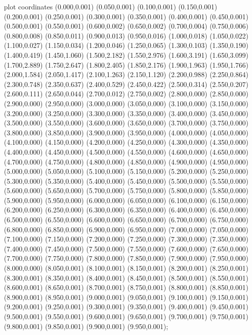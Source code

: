  plot coordinates {(0.000,0.001) (0.050,0.001) (0.100,0.001) (0.150,0.001) (0.200,0.001) (0.250,0.001) (0.300,0.001) (0.350,0.001) (0.400,0.001) (0.450,0.001) (0.500,0.001) (0.550,0.001) (0.600,0.002) (0.650,0.002) (0.700,0.004) (0.750,0.006) (0.800,0.008) (0.850,0.011) (0.900,0.013) (0.950,0.016) (1.000,0.018) (1.050,0.022) (1.100,0.027) (1.150,0.034) (1.200,0.046) (1.250,0.065) (1.300,0.103) (1.350,0.190) (1.400,0.419) (1.450,1.060) (1.500,2.182) (1.550,2.976) (1.600,3.191) (1.650,3.099) (1.700,2.889) (1.750,2.647) (1.800,2.405) (1.850,2.176) (1.900,1.963) (1.950,1.766) (2.000,1.584) (2.050,1.417) (2.100,1.263) (2.150,1.120) (2.200,0.988) (2.250,0.864) (2.300,0.748) (2.350,0.637) (2.400,0.529) (2.450,0.422) (2.500,0.314) (2.550,0.207) (2.600,0.111) (2.650,0.044) (2.700,0.012) (2.750,0.002) (2.800,0.000) (2.850,0.000) (2.900,0.000) (2.950,0.000) (3.000,0.000) (3.050,0.000) (3.100,0.000) (3.150,0.000) (3.200,0.000) (3.250,0.000) (3.300,0.000) (3.350,0.000) (3.400,0.000) (3.450,0.000) (3.500,0.000) (3.550,0.000) (3.600,0.000) (3.650,0.000) (3.700,0.000) (3.750,0.000) (3.800,0.000) (3.850,0.000) (3.900,0.000) (3.950,0.000) (4.000,0.000) (4.050,0.000) (4.100,0.000) (4.150,0.000) (4.200,0.000) (4.250,0.000) (4.300,0.000) (4.350,0.000) (4.400,0.000) (4.450,0.000) (4.500,0.000) (4.550,0.000) (4.600,0.000) (4.650,0.000) (4.700,0.000) (4.750,0.000) (4.800,0.000) (4.850,0.000) (4.900,0.000) (4.950,0.000) (5.000,0.000) (5.050,0.000) (5.100,0.000) (5.150,0.000) (5.200,0.000) (5.250,0.000) (5.300,0.000) (5.350,0.000) (5.400,0.000) (5.450,0.000) (5.500,0.000) (5.550,0.000) (5.600,0.000) (5.650,0.000) (5.700,0.000) (5.750,0.000) (5.800,0.000) (5.850,0.000) (5.900,0.000) (5.950,0.000) (6.000,0.000) (6.050,0.000) (6.100,0.000) (6.150,0.000) (6.200,0.000) (6.250,0.000) (6.300,0.000) (6.350,0.000) (6.400,0.000) (6.450,0.000) (6.500,0.000) (6.550,0.000) (6.600,0.000) (6.650,0.000) (6.700,0.000) (6.750,0.000) (6.800,0.000) (6.850,0.000) (6.900,0.000) (6.950,0.000) (7.000,0.000) (7.050,0.000) (7.100,0.000) (7.150,0.000) (7.200,0.000) (7.250,0.000) (7.300,0.000) (7.350,0.000) (7.400,0.000) (7.450,0.000) (7.500,0.000) (7.550,0.000) (7.600,0.000) (7.650,0.000) (7.700,0.000) (7.750,0.000) (7.800,0.000) (7.850,0.000) (7.900,0.000) (7.950,0.000) (8.000,0.000) (8.050,0.001) (8.100,0.001) (8.150,0.001) (8.200,0.001) (8.250,0.001) (8.300,0.001) (8.350,0.001) (8.400,0.001) (8.450,0.001) (8.500,0.001) (8.550,0.001) (8.600,0.001) (8.650,0.001) (8.700,0.001) (8.750,0.001) (8.800,0.001) (8.850,0.001) (8.900,0.001) (8.950,0.001) (9.000,0.001) (9.050,0.001) (9.100,0.001) (9.150,0.001) (9.200,0.001) (9.250,0.001) (9.300,0.001) (9.350,0.001) (9.400,0.001) (9.450,0.001) (9.500,0.001) (9.550,0.001) (9.600,0.001) (9.650,0.001) (9.700,0.001) (9.750,0.001) (9.800,0.001) (9.850,0.001) (9.900,0.001) (9.950,0.001)};
